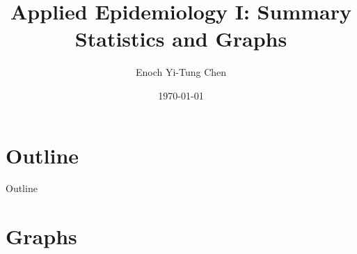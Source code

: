 


\title[Applied Epi I: Summary Statistics and Graphs]{Applied Epidemiology I: Summary Statistics and Graphs}
\date{\today}
\author[Enoch Yi-Tung Chen]{Enoch Yi-Tung Chen}




\begin{frame}
\maketitle 
\end{frame}




\section*{Outline}
\begin{frame}{Outline}
          \tableofcontents
\end{frame}

\section{Graphs}
